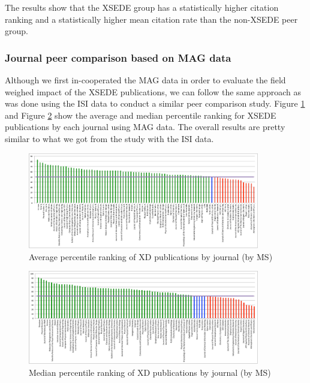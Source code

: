 \documentclass{sig-alternate}
\begin{document}
The results show that the XSEDE group has a statistically higher
citation ranking and a statistically higher mean citation rate than
the non-XSEDE peer group.

\subsubsection{Journal peer comparison based on MAG data}

Although we first in-cooperated the MAG data in order to evaluate the
field weighed impact of the XSEDE publications, we can follow the same
approach as was done using the ISI data to conduct a similar peer
comparison study. Figure \ref{F:ms_peers_byj_mean} and Figure
\ref{F:ms_peers_byj_median} show the average and median percentile
ranking for XSEDE publications by each journal using MAG data. The
overall results are pretty similar to what we got from the study with
the ISI data.

\begin{figure}[htb!]
  \centering
    \includegraphics[width=0.9\textwidth]{images/ms_peers_byj_mean_10.pdf}
    \caption{Average percentile ranking of XD publications by journal (by MS)}
    \label{F:ms_peers_byj_mean}
\end{figure}

\begin{figure}[htb!]
  \centering
    \includegraphics[width=0.9\textwidth]{images/ms_peers_byj_median_10.pdf}
    \caption{Median percentile ranking of XD publications by journal (by MS)}
    \label{F:ms_peers_byj_median}
\end{figure}
\end{document}
